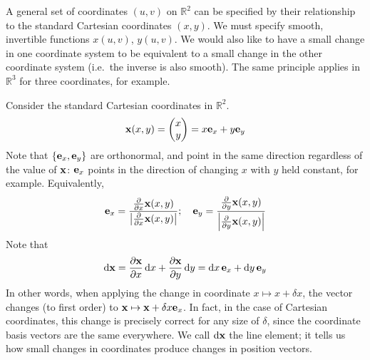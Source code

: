 A general set of coordinates \((u, v)\) on \(\mathbb R^2\) can be specified by their relationship to the standard Cartesian coordinates \((x, y)\).
We must specify smooth, invertible functions \(x(u, v)\), \(y(u, v)\).
We would also like to have a small change in one coordinate system to be equivalent to a small change in the other coordinate system (i.e.\ the inverse is also smooth).
The same principle applies in \(\mathbb R^3\) for three coordinates, for example.

Consider the standard Cartesian coordinates in \(\mathbb R^2\).
\[
	\vb x(x, y) = \begin{pmatrix}
		x \\ y
	\end{pmatrix} = x \vb e_x + y \vb e_y
\]
Note that \(\{\vb e_x, \vb e_y\}\) are orthonormal, and point in the same direction regardless of the value of \(\vb x\): \(\vb e_x\) points in the direction of changing \(x\) with \(y\) held constant, for example.
Equivalently,
\[
	\vb e_x = \frac{\frac{\partial}{\partial x} \vb x(x, y)}{\abs{\frac{\partial}{\partial x} \vb x(x, y)}};\quad \vb e_y = \frac{\frac{\partial}{\partial y} \vb x(x, y)}{\abs{\frac{\partial}{\partial y} \vb x(x, y)}}
\]
Note that
\[
	\dd \vb x = \frac{\partial \vb x}{\partial x}\dd{x} + \frac{\partial \vb x}{\partial y} \dd{y} = \dd{x} \vb e_x + \dd{y} \vb e_y
\]
In other words, when applying the change in coordinate \(x \mapsto x + \delta x\), the vector changes (to first order) to \(\vb x \mapsto \vb x + \delta x \vb e_x\).
In fact, in the case of Cartesian coordinates, this change is precisely correct for any size of \(\delta\), since the coordinate basis vectors are the same everywhere.
We call \(\dd \vb x\) the line element; it tells us how small changes in coordinates produce changes in position vectors.

